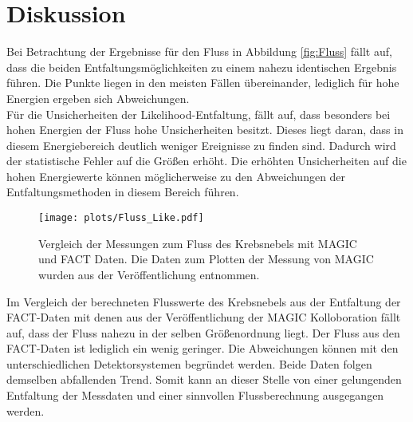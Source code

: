\section{Diskussion}
Bei Betrachtung der Ergebnisse für den Fluss in Abbildung \ref{fig:Fluss} fällt auf, dass die beiden Entfaltungsmöglichkeiten zu einem nahezu identischen Ergebnis führen. Die Punkte liegen in den meisten Fällen übereinander, lediglich für hohe Energien ergeben sich Abweichungen.\\
Für die Unsicherheiten der Likelihood-Entfaltung, fällt auf, dass besonders bei hohen Energien der Fluss hohe Unsicherheiten besitzt. Dieses liegt daran, dass in diesem Energiebereich deutlich weniger Ereignisse zu finden sind. Dadurch wird der statistische Fehler auf die Größen erhöht. Die erhöhten Unsicherheiten auf die hohen Energiewerte können möglicherweise zu den Abweichungen der Entfaltungsmethoden in diesem Bereich führen.
\begin{figure}
	\texttt{[image: plots/Fluss\_Like.pdf]}
	\caption{Vergleich der Messungen zum Fluss des Krebsnebels mit MAGIC und FACT Daten. Die Daten zum Plotten der Messung von MAGIC wurden aus der Veröffentlichung \cite{Aleksic:2014jva} entnommen.}
	\label{fig:VGL}
\end{figure}
\FloatBarrier
Im Vergleich der berechneten Flusswerte des Krebsnebels aus der Entfaltung der FACT-Daten mit denen aus der Veröffentlichung \cite{Aleksic:2014jva} der MAGIC Kolloboration fällt auf, dass der Fluss nahezu in der selben Größenordnung liegt. Der Fluss aus den FACT-Daten ist lediglich ein wenig geringer. Die Abweichungen können mit den unterschiedlichen Detektorsystemen begründet werden. Beide Daten folgen demselben abfallenden Trend. Somit kann an dieser Stelle von einer gelungenden Entfaltung der Messdaten und einer sinnvollen Flussberechnung ausgegangen werden.
